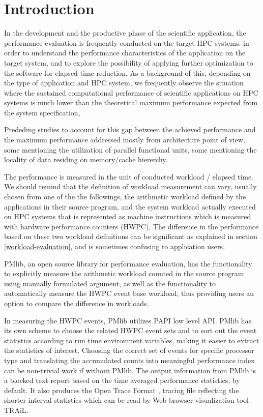 \documentclass[conference]{IEEEtran}
\begin{document}
\section{Introduction}
In the development and the productive phase of the scientific application,
the performance evaluation is frequently conducted on the target HPC systems.
in order to understand the performance characteristics
of the application on the target system, and to explore the possibility of
applying further optimization to the software for elapsed time reduction.
As a background of this,
depending on the type of application and HPC system,
we frequently observe the situation where
the sustained computational performance of scientific applications on HPC
systems is much lower than the theoretical maximum performance
expected from the system specification,

Prededing studies to account for this gap between the achieved
performance and the maximum performance addressed mostly from architecture
point of view,
some mentioning the utilization of parallel functional units,
some mentioning the locality of data residing on memory/cache hiererchy.

The performance is measured in the unit of conducted workload / elapsed time.
We should remind that the definition of workload measurement can vary,
usually chosen from one of the the followings,
the arithmetic workload defined by the applications in their source program,
and the system workload actually executed on HPC systems that is represented
as machine instructions which is measured with hardware performance counters
(HWPC).
The difference in the performance based on these two workload definitions
can be significant as explained in section \ref{workload-evaluation},
and is sometimes confusing to application users.

PMlib, an open source library for performance evaluation,
\cite{PMlib:webpage-public}
has the functionality
to explicitly measure the arithmetic workload counted in the source program
using manually formulated argument, as well as the functionality
to automatically measure the HWPC event base workload,
thus providing users an option to compare the difference in workloads.

In measuring the HWPC events, PMlib utilizes PAPI \cite{PAPI:5.6} low level API.
PMlib has its own scheme to choose the related HWPC event sets and to sort out
the event statistics according to run time environment variables, making it
easier to extract the statistics of interest.
Choosing the correct set of events for specific processor type and
translating the accumulated counts into meaningful performance index can be
non-trivial work if without PMlib.
The output information from PMlib is a blocked text report based on
the time averaged performance statistics, by default.
It also produces the Open Trace Format
\cite{Knupfer:2006}, \cite{OTF:webpage-public}
tracing file reflecting
the shorter interval statistics which can be read by Web browser
visualization tool TRAiL.%
\end{document}
